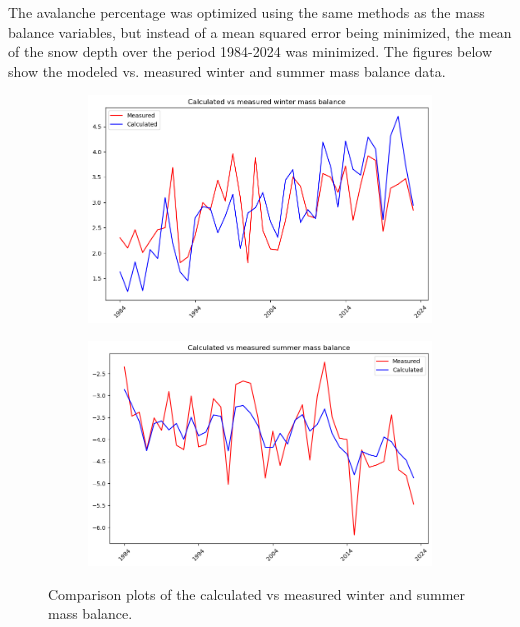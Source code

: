 \documentclass{article}
\begin{document}
The avalanche percentage was optimized using the same methods as the mass balance variables, but instead of a mean squared error being 
minimized, the mean of the snow depth over the period 1984-2024 was minimized.
The figures below show the modeled vs. measured winter and summer mass balance data.

\begin{figure}[h]
    \centering
    \begin{subfigure}[b]{0.49\textwidth}
        \centering
        \includegraphics[width=\textwidth]{Plots/winter_mb_compare.png}
        \label{fig:winter_mb_compare}
    \end{subfigure}
    \hfill
    \begin{subfigure}[b]{0.49\textwidth}
        \centering
        \includegraphics[width=\textwidth]{Plots/summer_mb_compare.png}
        \label{fig:summer_mb_compare}
    \end{subfigure}
    \caption{Comparison plots of the calculated vs measured winter and summer mass balance.}
    \label{fig:mb_comparison}
\end{figure}
\FloatBarrier
\end{document}
